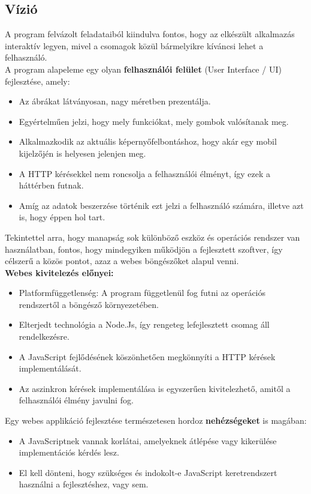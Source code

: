 \pagebreak

	\subsection{Vízió}
	
	A program felvázolt feladataiból kiindulva fontos, hogy az elkészült alkalmazás interaktív legyen, mivel a csomagok közül bármelyikre kíváncsi lehet a felhasználó.\\
	
	A program alapeleme egy olyan \textbf{felhasználói felület} (User Interface / UI) fejlesztése, amely: 
	
	\begin{itemize}
		\item Az ábrákat látványosan, nagy méretben prezentálja.
		\item Egyértelműen jelzi, hogy mely funkciókat, mely gombok valósítanak meg.
		\item Alkalmazkodik az aktuális képernyőfelbontáshoz, hogy akár egy mobil kijelzőjén is helyesen jelenjen meg.
		\item A HTTP kérésekkel nem roncsolja a felhasználói élményt, így ezek a háttérben futnak.
		\item Amíg az adatok beszerzése történik ezt jelzi a felhasználó számára, illetve azt is, hogy éppen hol tart.
	\end{itemize}
	
	Tekintettel arra, hogy manapság sok különböző eszköz és operációs rendszer van használatban, fontos, hogy mindegyiken működjön a fejlesztett szoftver, így célszerű a közös pontot, azaz a webes böngészőket alapul venni.\\
	 
	\textbf{Webes kivitelezés előnyei:}
	\begin{itemize}
		\item Platformfüggetlenség: A program függetlenül fog futni az operációs rendszertől a böngésző környezetében.
		\item Elterjedt technológia a Node.Js, így rengeteg lefejlesztett csomag áll rendelkezésre.
		\item A JavaScript fejlődésének köszönhetően megkönnyíti a HTTP kérések implementálását.
		\item Az aszinkron kérések implementálása is egyszerűen kivitelezhető, amitől a felhasználói élmény javulni fog. 
	\end{itemize}
	
	\noindent Egy webes applikáció fejlesztése természetesen hordoz \textbf{nehézségeket} is magában:
	\begin{itemize}
		\item A JavaScriptnek vannak korlátai, amelyeknek átlépése vagy kikerülése implementációs kérdés lesz.
		\item El kell dönteni, hogy szükséges és indokolt-e JavaScript keretrendszert használni a fejlesztéshez, vagy sem.
	\end{itemize}
	
